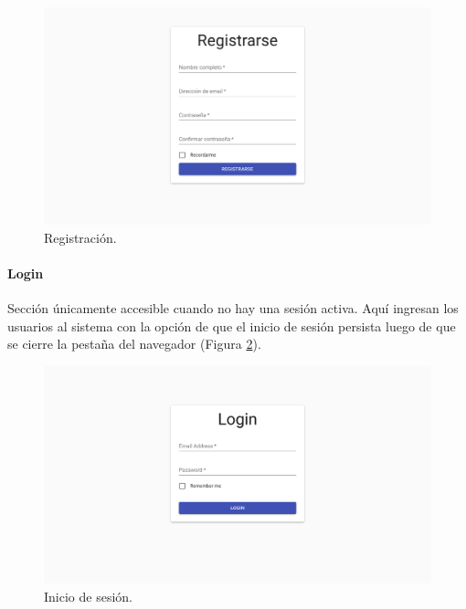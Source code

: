 \documentclass[12pt,a4paper,]{scrartcl}
\let\oldparagraph\paragraph
\renewcommand{\paragraph}[1]{\oldparagraph{#1}\mbox{}}
\begin{document}
\begin{figure}[H]

{\centering \includegraphics{assets/logic/register.pdf} 

}

\caption{Registración.}\label{fig:logic-registration}
\end{figure}

\hypertarget{login}{%
\paragraph{Login}\label{login}}

Sección únicamente accesible cuando no hay una sesión activa. Aquí ingresan los usuarios al sistema con la opción de que el inicio de sesión persista luego de que se cierre la pestaña del navegador (Figura \ref{fig:logic-login}).

\begin{figure}[H]

{\centering \includegraphics{assets/logic/login.pdf} 

}

\caption{Inicio de sesión.}\label{fig:logic-login}
\end{figure}
\end{document}
